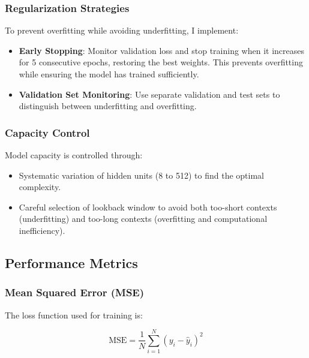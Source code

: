 \documentclass[conference]{IEEEtran}
\begin{document}
\subsubsection{Regularization Strategies}

To prevent overfitting while avoiding underfitting, I implement:

\begin{itemize}
    \item \textbf{Early Stopping}: Monitor validation loss and stop
    training when it increases for 5 consecutive epochs, restoring
    the best weights. This prevents overfitting while ensuring the
    model has trained sufficiently.
    
    \item \textbf{Validation Set Monitoring}: Use separate validation
    and test sets to distinguish between underfitting and overfitting.
\end{itemize}

\subsubsection{Capacity Control}

Model capacity is controlled through:

\begin{itemize}
    \item Systematic variation of hidden units (8 to 512) to find the
    optimal complexity.
    
    \item Careful selection of lookback window to avoid both too-short
    contexts (underfitting) and too-long contexts (overfitting and
    computational inefficiency).
\end{itemize}

\subsection{Performance Metrics}

\subsubsection{Mean Squared Error (MSE)}

The loss function used for training is:

\begin{equation}
\text{MSE} =
\frac{1}{N}\sum_{i=1}^{N}(y_i - \hat{y}_i)^2
\end{equation}
\end{document}
